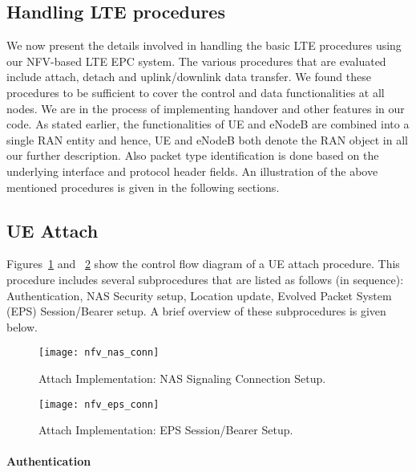 \documentclass[hidelinks]{report}
\begin{document}
\subsection*{Handling LTE procedures}

We now present the details involved in handling the basic LTE procedures using our NFV-based LTE EPC system. The various procedures that are evaluated include attach, detach and uplink/downlink data transfer. We found these procedures to be sufficient to cover the control and data functionalities at all nodes. We are in the process of implementing handover and other features in our code. As stated earlier, the functionalities of UE and eNodeB are combined into a single RAN entity and hence, UE and eNodeB both denote the RAN object in all our further description. Also packet type identification is done based on the underlying interface and protocol header fields. An illustration of the above mentioned procedures is given in the following sections.

\subsection*{UE Attach}
Figures~\ref{nfv_nas_conn} and ~\ref{nfv_eps_conn} show the control flow diagram of a UE attach procedure. This procedure includes several subprocedures that are listed as follows (in sequence): Authentication, NAS Security setup, Location update, Evolved Packet System (EPS) Session/Bearer setup. A brief overview of these subprocedures is given below.

\begin{figure}[h]

\centering
\texttt{[image: nfv\_nas\_conn]}
\caption{Attach Implementation: NAS Signaling Connection Setup.}
\label{nfv_nas_conn}

\end{figure}

\begin{figure}[h]

\centering
\texttt{[image: nfv\_eps\_conn]}
\caption{Attach Implementation: EPS Session/Bearer Setup.}
\label{nfv_eps_conn}

\end{figure}

\paragraph*{Authentication}
\end{document}
